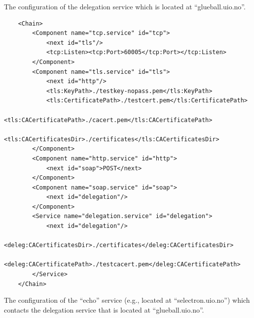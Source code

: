 \documentclass{article}                            %
\begin{document}
The configuration of the delegation service which is located at ``glueball.uio.no''.

\begin{verbatim}
    <Chain>
        <Component name="tcp.service" id="tcp">
            <next id="tls"/>
            <tcp:Listen><tcp:Port>60005</tcp:Port></tcp:Listen>
        </Component>
        <Component name="tls.service" id="tls">
            <next id="http"/>
            <tls:KeyPath>./testkey-nopass.pem</tls:KeyPath>
            <tls:CertificatePath>./testcert.pem</tls:CertificatePath>
            <tls:CACertificatePath>./cacert.pem</tls:CACertificatePath>
              <tls:CACertificatesDir>./certificates</tls:CACertificatesDir>
        </Component>
        <Component name="http.service" id="http">
            <next id="soap">POST</next>
        </Component>
        <Component name="soap.service" id="soap">
            <next id="delegation"/>
        </Component>
        <Service name="delegation.service" id="delegation">
            <next id="delegation"/>
            <deleg:CACertificatesDir>./certificates</deleg:CACertificatesDir>
            <deleg:CACertificatePath>./testcacert.pem</deleg:CACertificatePath>
        </Service>
    </Chain>
\end{verbatim}

The configuration of the ``echo'' service (e.g., located at ``selectron.uio.no'') which contacts the delegation service that is located at ``glueball.uio.no''.
\end{document}
